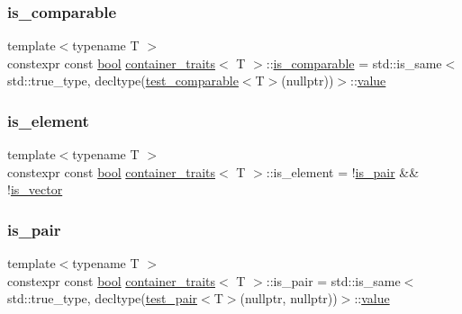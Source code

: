 \subsubsection{\texorpdfstring{is\_comparable}{is\_comparable}}
{\footnotesize\ttfamily template$<$typename T $>$ \\
constexpr const \mbox{\hyperlink{asdl_8h_af6a258d8f3ee5206d682d799316314b1}{bool}} \mbox{\hyperlink{structcontainer__traits}{container\+\_\+traits}}$<$ T $>$\+::\mbox{\hyperlink{structis__comparable}{is\+\_\+comparable}} = std\+::is\+\_\+same$<$std\+::true\+\_\+type, decltype(\mbox{\hyperlink{structcontainer__traits_a0a60178e5fff65d3a89a1454776e1668}{test\+\_\+comparable}}$<$T$>$(nullptr))$>$\+::\mbox{\hyperlink{_s_d_l__opengl__glext_8h_a8ad81492d410ff2ac11f754f4042150f}{value}}\hspace{0.3cm}{\ttfamily [static]}}

\mbox{\label{structcontainer__traits_ae5c7a42dfa2b713aae741ed37d6c192b}} 
\subsubsection{\texorpdfstring{is\_element}{is\_element}}
{\footnotesize\ttfamily template$<$typename T $>$ \\
constexpr const \mbox{\hyperlink{asdl_8h_af6a258d8f3ee5206d682d799316314b1}{bool}} \mbox{\hyperlink{structcontainer__traits}{container\+\_\+traits}}$<$ T $>$\+::is\+\_\+element = !\mbox{\hyperlink{structcontainer__traits_ae17fa45f5c1984602e162ba0d9ee7f72}{is\+\_\+pair}} \&\& !\mbox{\hyperlink{structcontainer__traits_a766d4e152eb677e230229880dee2dbb2}{is\+\_\+vector}}\hspace{0.3cm}{\ttfamily [static]}}

\mbox{\label{structcontainer__traits_ae17fa45f5c1984602e162ba0d9ee7f72}} 
\subsubsection{\texorpdfstring{is\_pair}{is\_pair}}
{\footnotesize\ttfamily template$<$typename T $>$ \\
constexpr const \mbox{\hyperlink{asdl_8h_af6a258d8f3ee5206d682d799316314b1}{bool}} \mbox{\hyperlink{structcontainer__traits}{container\+\_\+traits}}$<$ T $>$\+::is\+\_\+pair = std\+::is\+\_\+same$<$std\+::true\+\_\+type, decltype(\mbox{\hyperlink{structcontainer__traits_a29ea1a081953a79394605cc9ca7a3694}{test\+\_\+pair}}$<$T$>$(nullptr, nullptr))$>$\+::\mbox{\hyperlink{_s_d_l__opengl__glext_8h_a8ad81492d410ff2ac11f754f4042150f}{value}}\hspace{0.3cm}{\ttfamily [static]}}

